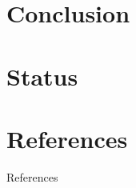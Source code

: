 

\section{Conclusion}


\section{Status}

\section{References}
\begin{frame}[allowframebreaks]{References}


\end{frame}
